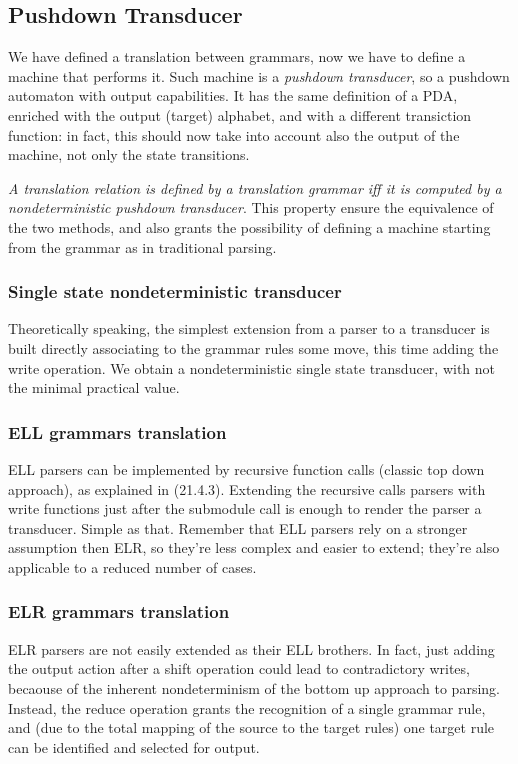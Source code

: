 		\subsection{Pushdown Transducer}
			We have defined a translation between grammars, now we have to define a machine that performs it. Such machine is a \emph{pushdown transducer}, so a 
			pushdown automaton with output capabilities. It has the same definition of a PDA, enriched with the output (target) alphabet, and with a different 
			transiction function: in fact, this should now take into account also the output of the machine, not only the state transitions.

			\emph{A translation relation is defined by a translation grammar iff it is computed by a nondeterministic pushdown transducer}. This property ensure 
			the equivalence of the two methods, and also grants the possibility of defining a machine starting from the grammar as in traditional parsing. 
			
			\subsubsection{Single state nondeterministic transducer}
				Theoretically speaking, the simplest extension from a parser to a transducer is built directly associating to the grammar rules some move, this time 
				adding the write operation. We obtain a nondeterministic single state transducer, with not the minimal practical value.
			
			\subsubsection{ELL grammars translation}
				ELL parsers can be implemented by recursive function calls (classic top down approach), as explained in (21.4.3). Extending the recursive calls 
				parsers with write functions just after the submodule call is enough to render the parser a transducer. Simple as that. Remember that ELL parsers 
				rely on a stronger assumption then ELR, so they're less complex and easier to extend; they're also applicable to a reduced number of cases.
			
			\subsubsection{ELR grammars translation}
				ELR parsers are not easily extended as their ELL brothers. In fact, just adding the output action after a shift operation could lead to contradictory 
				writes, becaouse of the inherent nondeterminism of the bottom up approach to parsing. Instead, the reduce operation grants the recognition of a 
				single grammar rule, and (due to the total mapping of the source to the target rules) one target rule can be identified and selected for output.


